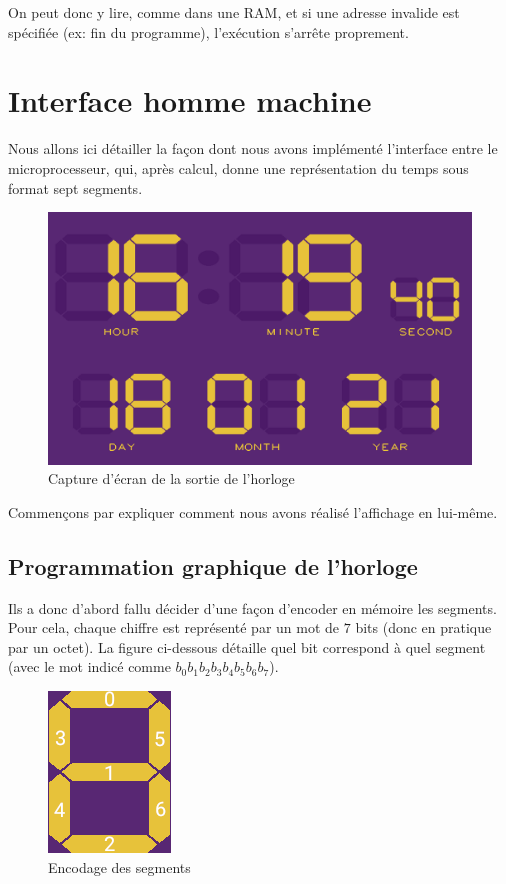 \documentclass[10pt,a4paper,notitlepage ]{article}
\begin{document}
	On peut donc y lire, comme dans une RAM, et si une adresse invalide est spécifiée (ex: fin du programme), l'exécution s'arrête proprement.
	
	
	\section{Interface homme machine}
	
	Nous allons ici détailler la façon dont nous avons implémenté l'interface entre le microprocesseur, qui, après calcul, donne une représentation du temps sous format sept segments.
	
	\begin{figure}[h]
		\centering
		\includegraphics[width=0.7\linewidth]{2021-01-18_16-19}
		\caption{Capture d'écran de la sortie de l'horloge}
		\label{fig:2021-01-1816-19}
	\end{figure}
	
	Commençons par expliquer comment nous avons réalisé l'affichage en lui-même.
	
	\subsection{Programmation graphique de l'horloge}
	
	Ils a donc d'abord fallu décider d'une façon d'encoder en mémoire les segments. Pour cela, chaque chiffre est représenté par un mot de $7$ bits (donc en pratique par un octet). La figure ci-dessous détaille quel bit correspond à quel segment (avec le mot indicé comme $b_0b_1b_2b_3b_4b_5b_6b_7$).
	
	\begin{figure}[h]
		\centering
		\includegraphics[width=0.3\linewidth]{segments}
		\caption{Encodage des segments}
		\label{fig:segments}
	\end{figure}
	
\end{document}
